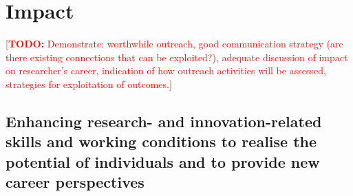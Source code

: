 \documentclass[a4paper,11pt]{article}
\newcommand{\TODO}[1]{{\textcolor{red}{[\textbf{TODO:} #1]}}}
\begin{document}
%
%
%

\section{Impact}
\label{sec:impact}

\TODO{Demonstrate: worthwhile outreach, good communication strategy (are there existing connections that can be exploited?), adequate discussion of impact on researcher's career, indication of how outreach activities will be assessed, strategies for exploitation of outcomes.}

\subsection{Enhancing research- and innovation-related skills and working conditions to realise the potential of individuals and to provide new career perspectives}
\label{sec:enhancement}
\end{document}

